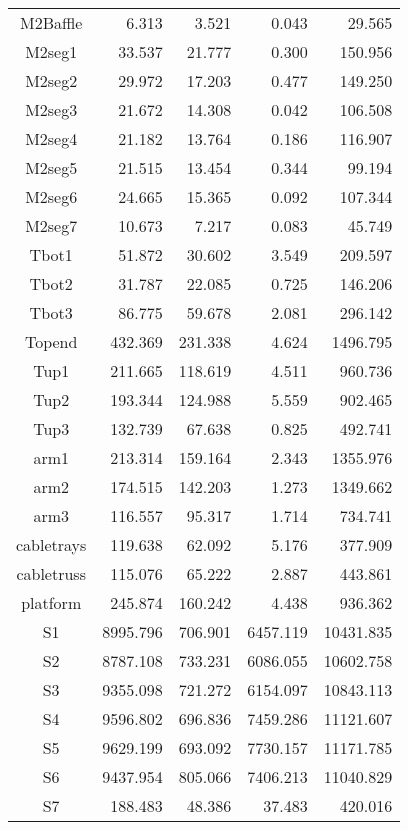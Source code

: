 \begin{longtable}{crrrr}
 M2Baffle & 6.313 & 3.521 & 0.043 & 29.565 \\
 M2seg1 & 33.537 & 21.777 & 0.300 & 150.956 \\
 M2seg2 & 29.972 & 17.203 & 0.477 & 149.250 \\
 M2seg3 & 21.672 & 14.308 & 0.042 & 106.508 \\
 M2seg4 & 21.182 & 13.764 & 0.186 & 116.907 \\
 M2seg5 & 21.515 & 13.454 & 0.344 & 99.194 \\
 M2seg6 & 24.665 & 15.365 & 0.092 & 107.344 \\
 M2seg7 & 10.673 & 7.217 & 0.083 & 45.749 \\
 Tbot1 & 51.872 & 30.602 & 3.549 & 209.597 \\
 Tbot2 & 31.787 & 22.085 & 0.725 & 146.206 \\
 Tbot3 & 86.775 & 59.678 & 2.081 & 296.142 \\
 Topend & 432.369 & 231.338 & 4.624 & 1496.795 \\
 Tup1 & 211.665 & 118.619 & 4.511 & 960.736 \\
 Tup2 & 193.344 & 124.988 & 5.559 & 902.465 \\
 Tup3 & 132.739 & 67.638 & 0.825 & 492.741 \\
 arm1 & 213.314 & 159.164 & 2.343 & 1355.976 \\
 arm2 & 174.515 & 142.203 & 1.273 & 1349.662 \\
 arm3 & 116.557 & 95.317 & 1.714 & 734.741 \\
 cabletrays & 119.638 & 62.092 & 5.176 & 377.909 \\
 cabletruss & 115.076 & 65.222 & 2.887 & 443.861 \\
 platform & 245.874 & 160.242 & 4.438 & 936.362 \\
 S1 & 8995.796 & 706.901 & 6457.119 & 10431.835 \\
 S2 & 8787.108 & 733.231 & 6086.055 & 10602.758 \\
 S3 & 9355.098 & 721.272 & 6154.097 & 10843.113 \\
 S4 & 9596.802 & 696.836 & 7459.286 & 11121.607 \\
 S5 & 9629.199 & 693.092 & 7730.157 & 11171.785 \\
 S6 & 9437.954 & 805.066 & 7406.213 & 11040.829 \\
 S7 & 188.483 & 48.386 & 37.483 & 420.016 \\
\bottomrule
\end{longtable}



